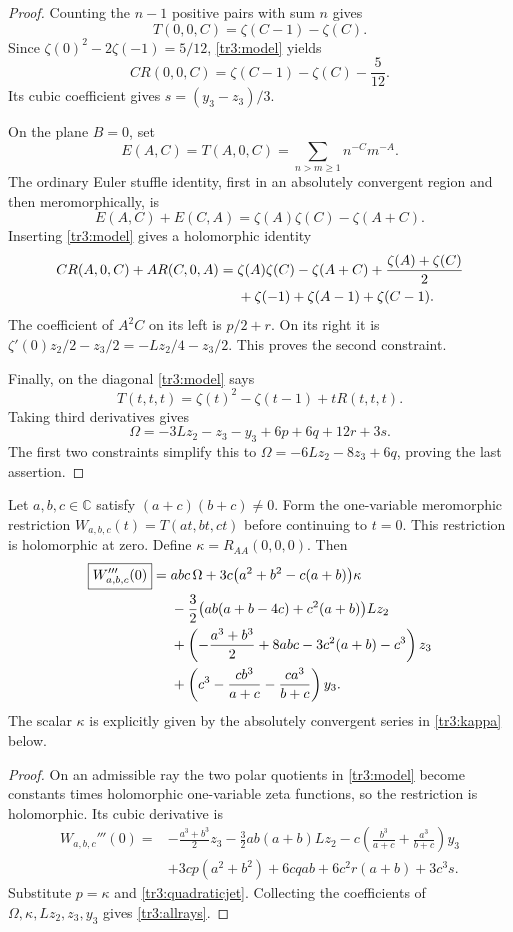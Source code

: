 \begin{proof}
Counting the $n-1$ positive pairs with sum $n$ gives
\[
 T(0,0,C)=\zeta(C-1)-\zeta(C).
\]
Since $\zeta(0)^2-2\zeta(-1)=5/12$, \eqref{tr3:model} yields
\[
 C R(0,0,C)=\zeta(C-1)-\zeta(C)-\frac5{12}.
\]
Its cubic coefficient gives $s=(y_3-z_3)/3$.

On the plane $B=0$, set
\[
 E(A,C)=T(A,0,C)=\sum_{n>m\geq1}n^{-C}m^{-A}.
\]
The ordinary Euler stuffle identity, first in an absolutely convergent
region and then meromorphically, is
\[
 E(A,C)+E(C,A)=\zeta(A)\zeta(C)-\zeta(A+C).
\]
Inserting \eqref{tr3:model} gives a holomorphic identity
\begin{align}\label{tr3:stuffleR}
 C R(A,0,C)+A R(C,0,A)
 ={}&\zeta(A)\zeta(C)-\zeta(A+C)
 +\frac{\zeta(A)+\zeta(C)}2\notag\\
 &+\zeta(-1)+\zeta(A-1)+\zeta(C-1).
\end{align}
The coefficient of $A^2C$ on its left is $p/2+r$.  On its right it is
$\zeta'(0)z_2/2-z_3/2=-Lz_2/4-z_3/2$.  This proves the second
constraint.

Finally, on the diagonal \eqref{tr3:model} says
\[
 T(t,t,t)=\zeta(t)^2-\zeta(t-1)+tR(t,t,t).
\]
Taking third derivatives gives
\[
 \Omega=-3Lz_2-z_3-y_3+6p+6q+12r+3s.
\]
The first two constraints simplify this to
$\Omega=-6Lz_2-8z_3+6q$, proving the last assertion.
\end{proof}

\begin{theorem}\label{tr3:main}
Let $a,b,c\in\mathbb C$ satisfy $(a+c)(b+c)\ne0$.  Form the
one-variable meromorphic restriction $W_{a,b,c}(t)=T(at,bt,ct)$ before
continuing to $t=0$.  This restriction is holomorphic at zero.  Define
$\kappa=R_{AA}(0,0,0)$.  Then
\begin{align}\label{tr3:allrays}
 \boxed{\displaystyle W_{a,b,c}'''(0)}
 ={}&abc\,\Omega
 +3c\bigl(a^2+b^2-c(a+b)\bigr)\kappa\notag\\
 &-\frac32\bigl(ab(a+b-4c)+c^2(a+b)\bigr)Lz_2\notag\\
 &+\left(-\frac{a^3+b^3}{2}+8abc-3c^2(a+b)-c^3\right)z_3\notag\\
 &+\left(c^3-\frac{cb^3}{a+c}-\frac{ca^3}{b+c}\right)y_3.
\end{align}
The scalar $\kappa$ is explicitly given by the absolutely convergent
series in \eqref{tr3:kappa} below.
\end{theorem}

\begin{proof}
On an admissible ray the two polar quotients in \eqref{tr3:model}
become constants times holomorphic one-variable zeta functions, so
the restriction is holomorphic.  Its cubic derivative is
\begin{align*}
 W_{a,b,c}'''(0)={}&-\frac{a^3+b^3}{2}z_3
 -\frac32ab(a+b)Lz_2
 -c\left(\frac{b^3}{a+c}+\frac{a^3}{b+c}\right)y_3\\
 &+3cp(a^2+b^2)+6cqab+6c^2r(a+b)+3c^3s.
\end{align*}
Substitute $p=\kappa$ and \eqref{tr3:quadraticjet}.  Collecting the
coefficients of $\Omega,\kappa,Lz_2,z_3,y_3$ gives
\eqref{tr3:allrays}.
\end{proof}

